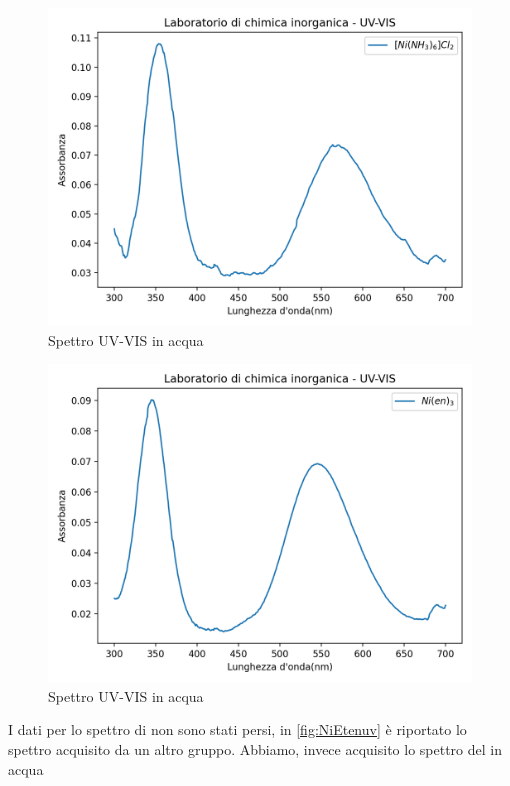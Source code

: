 \begin{figure}[ht!]
    \centering
    \includegraphics{Relazione/foto/ninh3uv.png}
    
    \caption{Spettro UV-VIS  in acqua}
    \label{fig:ninh3uv}
\end{figure}
\begin{figure}[ht!]
    \centering
   \includegraphics{Relazione/foto/Nienuv.png}
    \caption{Spettro UV-VIS  in acqua}
    \label{fig:nienuv}
\end{figure}
I dati per lo spettro di  non sono stati persi, in \autoref{fig:NiEtenuv} è riportato lo spettro acquisito da un altro gruppo. Abbiamo, invece acquisito lo spettro del  in acqua

